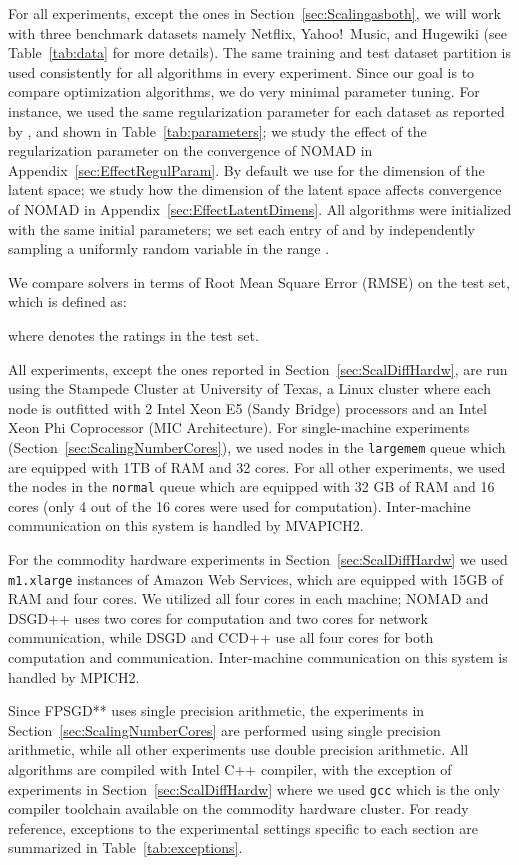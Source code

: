 \documentclass{vldb}
\begin{document}
For all experiments, except the ones in Section~\ref{sec:Scalingasboth},
we will work with three benchmark datasets namely Netflix, Yahoo!\
Music, and Hugewiki (see Table~\ref{tab:data} for more details).  The
same training and test dataset partition is used consistently for all
algorithms in every experiment. Since our goal is to compare
optimization algorithms, we do very minimal parameter tuning. For
instance, we used the same regularization parameter  for each
dataset as reported by \citet{YuHsiSiDhi12}, and shown in
Table~\ref{tab:parameters}; we study the effect of the regularization
parameter on the convergence of NOMAD in
Appendix~\ref{sec:EffectRegulParam}.  By default we use  for
the dimension of the latent space; we study how the dimension of the
latent space affects convergence of NOMAD in
Appendix~\ref{sec:EffectLatentDimens}.  All algorithms were initialized
with the same initial parameters; we set each entry of  and  by
independently sampling a uniformly random variable in the range
 \citep{YuHsiSiDhi12, ZhuChiJuaLin13}.

We compare solvers in terms of Root Mean Square Error (RMSE) on the test
set, which is defined as:

where  denotes the ratings in the test set.

All experiments, except the ones reported in
Section~\ref{sec:ScalDiffHardw}, are run using the Stampede Cluster at
University of Texas, a Linux cluster where each node is outfitted with
2 Intel Xeon E5 (Sandy Bridge) processors and an Intel Xeon Phi
Coprocessor (MIC Architecture).  For single-machine experiments
(Section~\ref{sec:ScalingNumberCores}), we used nodes in the
\texttt{largemem} queue which are equipped with 1TB of RAM and 32
cores. For all other experiments, we used the nodes in the
\texttt{normal} queue which are equipped with 32 GB of RAM and 16
cores (only 4 out of the 16 cores were used for computation).
Inter-machine communication on this system is handled by MVAPICH2.

For the commodity hardware experiments in
Section~\ref{sec:ScalDiffHardw} we used \texttt{m1.xlarge} instances of
Amazon Web Services, which are equipped with 15GB of RAM and four cores.
We utilized all four cores in each machine; NOMAD and DSGD++ uses two
cores for computation and two cores for network communication, while
DSGD and CCD++ use all four cores for both computation and
communication.  Inter-machine communication on this system is handled by
MPICH2.

Since FPSGD** uses single precision arithmetic, the experiments in
Section~\ref{sec:ScalingNumberCores} are performed using single
precision arithmetic, while all other experiments use double precision
arithmetic.  All algorithms are compiled with Intel C++ compiler, with
the exception of experiments in Section~\ref{sec:ScalDiffHardw} where we
used \texttt{gcc} which is the only compiler toolchain available on the
commodity hardware cluster.  For ready reference, exceptions to the
experimental settings specific to each section are summarized in
Table~\ref{tab:exceptions}.
\end{document}
